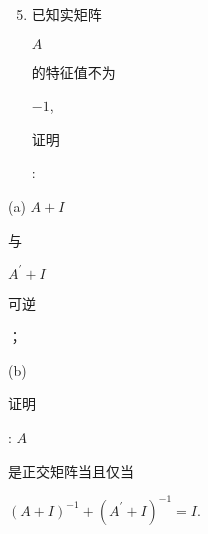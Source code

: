\documentclass[10pt]{article}
\begin{document}
\begin{enumerate}
  \setcounter{enumi}{4}
  \item \begin{CJK}{UTF8}{mj}已知实矩阵\end{CJK} $A$ \begin{CJK}{UTF8}{mj}的特征值不为\end{CJK} $-1$, \begin{CJK}{UTF8}{mj}证明\end{CJK}:
\end{enumerate}
(a) $A+I$ \begin{CJK}{UTF8}{mj}与\end{CJK} $A^{\prime}+I$ \begin{CJK}{UTF8}{mj}可逆\end{CJK}；

(b) \begin{CJK}{UTF8}{mj}证明\end{CJK}: $A$ \begin{CJK}{UTF8}{mj}是正交矩阵当且仅当\end{CJK} $(A+I)^{-1}+\left(A^{\prime}+I\right)^{-1}=I$.
\end{document}
